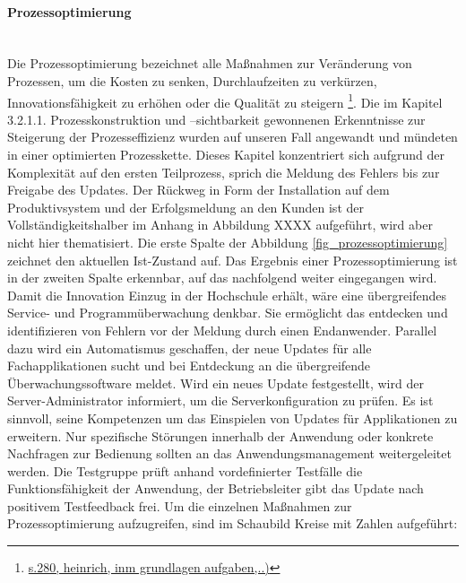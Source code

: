\paragraph{Prozessoptimierung}\mbox{}\\
Die Prozessoptimierung bezeichnet alle Maßnahmen zur Veränderung von Prozessen, um die Kosten zu senken, Durchlaufzeiten zu verkürzen, Innovationsfähigkeit zu erhöhen oder die Qualität zu steigern \footnote{\url{s.280, heinrich, inm grundlagen aufgaben,..)}}. 
Die im Kapitel 3.2.1.1. Prozesskonstruktion und –sichtbarkeit gewonnenen Erkenntnisse zur Steigerung der Prozesseffizienz wurden auf unseren Fall angewandt und mündeten in einer optimierten Prozesskette. Dieses Kapitel konzentriert sich aufgrund der Komplexität auf den ersten Teilprozess, sprich die Meldung des Fehlers bis zur Freigabe des Updates. Der Rückweg in Form der Installation auf dem Produktivsystem und der Erfolgsmeldung an den Kunden ist der Vollständigkeitshalber im Anhang in Abbildung XXXX aufgeführt, wird aber nicht hier thematisiert. 
Die erste Spalte der Abbildung \ref{fig_prozessoptimierung} zeichnet den aktuellen Ist-Zustand auf. Das Ergebnis einer Prozessoptimierung ist in der zweiten Spalte erkennbar, auf das nachfolgend weiter eingegangen wird. Damit die Innovation Einzug in der Hochschule erhält, wäre eine übergreifendes Service- und Programmüberwachung denkbar. Sie ermöglicht das entdecken und identifizieren von Fehlern vor der Meldung durch einen Endanwender. Parallel dazu wird ein Automatismus geschaffen, der neue Updates für alle Fachapplikationen sucht und bei Entdeckung an die übergreifende Überwachungssoftware meldet. Wird ein neues Update festgestellt, wird der Server-Administrator informiert, um die Serverkonfiguration zu prüfen. Es ist sinnvoll, seine Kompetenzen um das Einspielen von Updates für Applikationen zu erweitern. Nur spezifische Störungen innerhalb der Anwendung oder konkrete Nachfragen zur Bedienung sollten an das Anwendungsmanagement weitergeleitet werden.  Die Testgruppe prüft anhand vordefinierter Testfälle die Funktionsfähigkeit der Anwendung, der Betriebsleiter gibt das Update nach positivem Testfeedback frei.
Um die einzelnen Maßnahmen zur Prozessoptimierung aufzugreifen, sind im Schaubild Kreise mit Zahlen aufgeführt:

